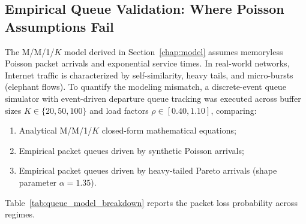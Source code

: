 \documentclass[12pt,a4paper,oneside]{report}
\begin{document}
\subsection{Empirical Queue Validation: Where Poisson Assumptions Fail}
The M/M/1/$K$ model derived in Section~\ref{chap:model} assumes memoryless Poisson packet arrivals and exponential service times. In real-world networks, Internet traffic is characterized by self-similarity, heavy tails, and micro-bursts (elephant flows). To quantify the modeling mismatch, a discrete-event queue simulator with event-driven departure queue tracking was executed across buffer sizes $K \in \{20, 50, 100\}$ and load factors $\rho \in [0.40, 1.10]$, comparing:
\begin{enumerate}
  \item Analytical M/M/1/$K$ closed-form mathematical equations;
  \item Empirical packet queues driven by synthetic Poisson arrivals;
  \item Empirical packet queues driven by heavy-tailed Pareto arrivals (shape parameter $\alpha=1.35$).
\end{enumerate}

Table~\ref{tab:queue_model_breakdown} reports the packet loss probability across regimes.
\end{document}
